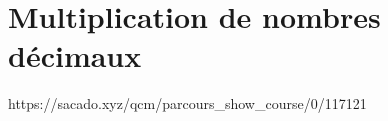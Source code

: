 

% 
% 


% 




\chapter{Multiplication de nombres décimaux}
{https://sacado.xyz/qcm/parcours_show_course/0/117121}

